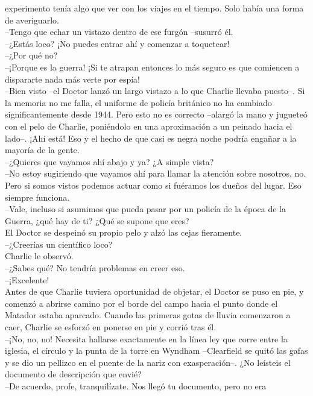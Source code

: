 experimento tenía algo que ver con los viajes en el tiempo. Solo había
una forma de averiguarlo.\\
--Tengo que echar un vistazo dentro de ese furgón --susurró él.\\
--¿Estás loco? ¡No puedes entrar ahí y comenzar a toquetear!\\
--¿Por qué no?\\
--¡Porque es la guerra! ¡Si te atrapan entonces lo más seguro es que
comiencen a dispararte nada más verte por espía!\\
--Bien visto --el Doctor lanzó un largo vistazo a lo que Charlie llevaba
puesto--. Si la memoria no me falla, el uniforme de policía británico no
ha cambiado significantemente desde 1944. Pero esto no es correcto
--alargó la mano y jugueteó con el pelo de Charlie, poniéndolo en una
aproximación a un peinado hacia el lado--. ¡Ahí está! Eso y el hecho de
que casi es negra noche podría engañar a la mayoría de la gente.\\
--¿Quieres que vayamos ahí abajo y ya? ¿A simple vista?\\
--No estoy sugiriendo que vayamos ahí para llamar la atención sobre
nosotros, no. Pero si somos vistos podemos actuar como si fuéramos los
dueños del lugar. Eso siempre funciona.\\
--Vale, incluso si asumimos que pueda pasar por un policía de la época
de la Guerra, ¿qué hay de ti? ¿Qué se supone que eres?\\
El Doctor se despeinó su propio pelo y alzó las cejas fieramente.\\
--¿Creerías un científico loco?\\
Charlie le observó.\\
--¿Sabes qué? No tendría problemas en creer eso.\\
--¡Excelente!\\
Antes de que Charlie tuviera oportunidad de objetar, el Doctor se puso
en pie, y comenzó a abrirse camino por el borde del campo hacia el punto
donde el Matador estaba aparcado. Cuando las primeras gotas de lluvia
comenzaron a caer, Charlie se esforzó en ponerse en pie y corrió tras
él.\\[2\baselineskip]--¡No, no, no! Necesita hallarse exactamente en la
línea ley que corre entre la iglesia, el círculo y la punta de la torre
en Wyndham --Clearfield se quitó las gafas y se dio un pellizco en el
puente de la nariz con exasperación--. ¿No leísteis el documento de
descripción que envié?\\
--De acuerdo, profe, tranquilízate. Nos llegó tu documento, pero no era
